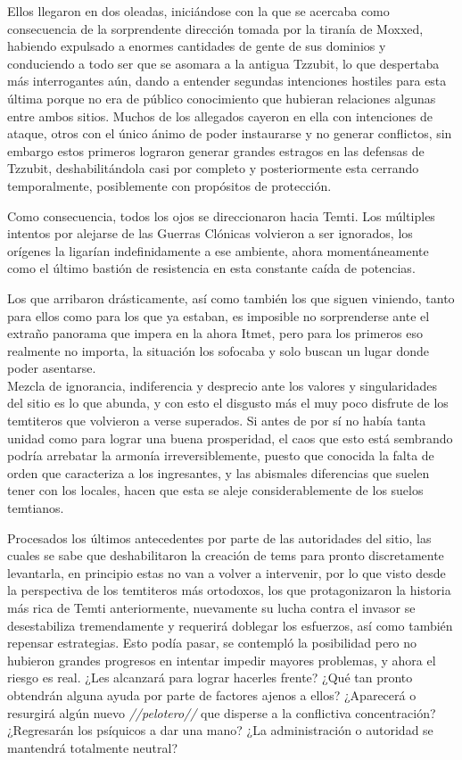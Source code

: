 \documentclass[
  spanish,
]{book}
\begin{document}
Ellos llegaron en dos oleadas, iniciándose con la que se acercaba como consecuencia de la sorprendente dirección tomada por la tiranía de Moxxed, habiendo expulsado a enormes cantidades de gente de sus dominios y conduciendo a todo ser que se asomara a la antigua Tzzubit, lo que despertaba más interrogantes aún, dando a entender segundas intenciones hostiles para esta última porque no era de público conocimiento que hubieran relaciones algunas entre ambos sitios. Muchos de los allegados cayeron en ella con intenciones de ataque, otros con el único ánimo de poder instaurarse y no generar conflictos, sin embargo estos primeros lograron generar grandes estragos en las defensas de Tzzubit, deshabilitándola casi por completo y posteriormente esta cerrando temporalmente, posiblemente con propósitos de protección.

Como consecuencia, todos los ojos se direccionaron hacia Temti. Los múltiples intentos por alejarse de las Guerras Clónicas volvieron a ser ignorados, los orígenes la ligarían indefinidamente a ese ambiente, ahora momentáneamente como el último bastión de resistencia en esta constante caída de potencias.

Los que arribaron drásticamente, así como también los que siguen viniendo, tanto para ellos como para los que ya estaban, es imposible no sorprenderse ante el extraño panorama que impera en la ahora Itmet, pero para los primeros eso realmente no importa, la situación los sofocaba y solo buscan un lugar donde poder asentarse.\\
Mezcla de ignorancia, indiferencia y desprecio ante los valores y singularidades del sitio es lo que abunda, y con esto el disgusto más el muy poco disfrute de los temtiteros que volvieron a verse superados. Si antes de por sí no había tanta unidad como para lograr una buena prosperidad, el caos que esto está sembrando podría arrebatar la armonía irreversiblemente, puesto que conocida la falta de orden que caracteriza a los ingresantes, y las abismales diferencias que suelen tener con los locales, hacen que esta se aleje considerablemente de los suelos temtianos.

Procesados los últimos antecedentes por parte de las autoridades del sitio, las cuales se sabe que deshabilitaron la creación de tems para pronto discretamente levantarla, en principio estas no van a volver a intervenir, por lo que visto desde la perspectiva de los temtiteros más ortodoxos, los que protagonizaron la historia más rica de Temti anteriormente, nuevamente su lucha contra el invasor se desestabiliza tremendamente y requerirá doblegar los esfuerzos, así como también repensar estrategias. Esto podía pasar, se contempló la posibilidad pero no hubieron grandes progresos en intentar impedir mayores problemas, y ahora el riesgo es real. ¿Les alcanzará para lograr hacerles frente? ¿Qué tan pronto obtendrán alguna ayuda por parte de factores ajenos a ellos? ¿Aparecerá o resurgirá algún nuevo \emph{//pelotero//} que disperse a la conflictiva concentración? ¿Regresarán los psíquicos a dar una mano? ¿La administración o autoridad se mantendrá totalmente neutral?
\end{document}
